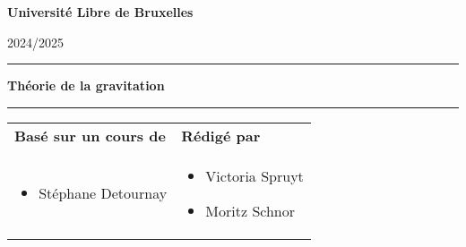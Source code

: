 \documentclass[a4paper,12pt]{report} %
\begin{document}
\begin{titlepage}
\begin{center}

{\bf {\large Université Libre de Bruxelles}}\\\vspace{0.8cm}
\begin{center}
2024/2025
\end{center}
\vspace{3cm}

\vspace{1.5cm}
\noindent\rule{\textwidth}{1mm}
\Large{\textbf{Théorie de la gravitation}}
\noindent\rule{\textwidth}{1mm}
\end{center}
\vspace{3cm}
\begin{tabular}{ p{9cm}  p{6cm} }
\textbf{Basé sur un cours de} & \textbf{Rédigé par} \\
\begin{itemize}
    \item Stéphane Detournay
\end{itemize}
&
\begin{itemize}
    \item Victoria Spruyt
    \item Moritz Schnor
\end{itemize}
\\
\end{tabular}
\\
\,\vspace{3cm}

\end{titlepage}

\tableofcontents
\newpage






%

%

%

%

%

%
\end{document}

